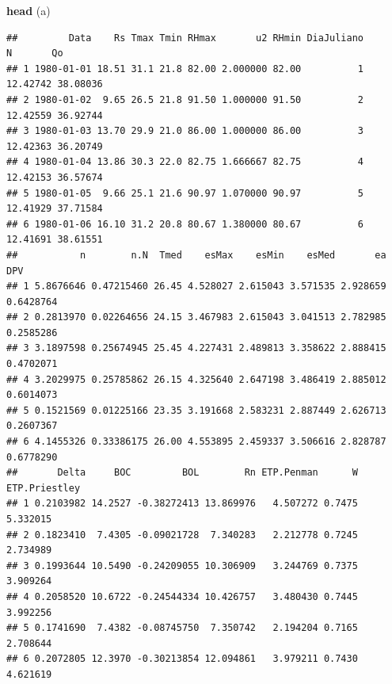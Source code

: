 \documentclass[
]{book}
\newenvironment{Shaded}{\begin{snugshade}}{\end{snugshade}}
\newcommand{\FloatTok}[1]{\textcolor[rgb]{0.00,0.00,0.81}{#1}}
\newcommand{\KeywordTok}[1]{\textcolor[rgb]{0.13,0.29,0.53}{\textbf{#1}}}
\newcommand{\NormalTok}[1]{#1}
\newcommand{\OperatorTok}[1]{\textcolor[rgb]{0.81,0.36,0.00}{\textbf{#1}}}
\newcommand{\StringTok}[1]{\textcolor[rgb]{0.31,0.60,0.02}{#1}}
\begin{document}
\begin{Shaded}
\end{Shaded}

\begin{Shaded}
\begin{Highlighting}[]
\KeywordTok{head}\NormalTok{ (a)}
\end{Highlighting}
\end{Shaded}

\begin{verbatim}
##         Data    Rs Tmax Tmin RHmax       u2 RHmin DiaJuliano        N       Qo
## 1 1980-01-01 18.51 31.1 21.8 82.00 2.000000 82.00          1 12.42742 38.08036
## 2 1980-01-02  9.65 26.5 21.8 91.50 1.000000 91.50          2 12.42559 36.92744
## 3 1980-01-03 13.70 29.9 21.0 86.00 1.000000 86.00          3 12.42363 36.20749
## 4 1980-01-04 13.86 30.3 22.0 82.75 1.666667 82.75          4 12.42153 36.57674
## 5 1980-01-05  9.66 25.1 21.6 90.97 1.070000 90.97          5 12.41929 37.71584
## 6 1980-01-06 16.10 31.2 20.8 80.67 1.380000 80.67          6 12.41691 38.61551
##           n        n.N  Tmed    esMax    esMin    esMed       ea       DPV
## 1 5.8676646 0.47215460 26.45 4.528027 2.615043 3.571535 2.928659 0.6428764
## 2 0.2813970 0.02264656 24.15 3.467983 2.615043 3.041513 2.782985 0.2585286
## 3 3.1897598 0.25674945 25.45 4.227431 2.489813 3.358622 2.888415 0.4702071
## 4 3.2029975 0.25785862 26.15 4.325640 2.647198 3.486419 2.885012 0.6014073
## 5 0.1521569 0.01225166 23.35 3.191668 2.583231 2.887449 2.626713 0.2607367
## 6 4.1455326 0.33386175 26.00 4.553895 2.459337 3.506616 2.828787 0.6778290
##       Delta     BOC         BOL        Rn ETP.Penman      W ETP.Priestley
## 1 0.2103982 14.2527 -0.38272413 13.869976   4.507272 0.7475      5.332015
## 2 0.1823410  7.4305 -0.09021728  7.340283   2.212778 0.7245      2.734989
## 3 0.1993644 10.5490 -0.24209055 10.306909   3.244769 0.7375      3.909264
## 4 0.2058520 10.6722 -0.24544334 10.426757   3.480430 0.7445      3.992256
## 5 0.1741690  7.4382 -0.08745750  7.350742   2.194204 0.7165      2.708644
## 6 0.2072805 12.3970 -0.30213854 12.094861   3.979211 0.7430      4.621619
\end{verbatim}
\end{document}
